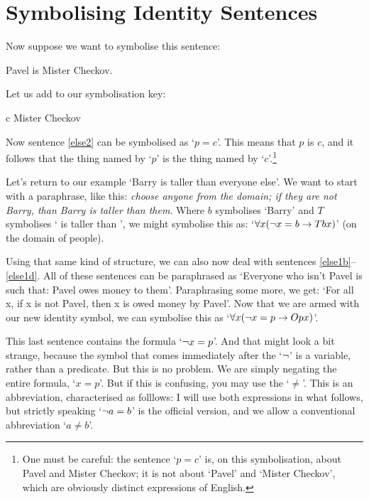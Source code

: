 \section{Symbolising Identity Sentences}

Now suppose we want to symbolise this sentence:
\begin{earg}
\item[\ex{else2}] Pavel is Mister Checkov.
\end{earg}
Let us add to our symbolisation key:
	\begin{ekey}
		\item[c] Mister Checkov
	\end{ekey}
Now sentence \ref{else2} can be symbolised as `$p=c$'. This means that $p$ is $c$, and it follows that the thing named by `$p$' is the thing named by `$c$'.\footnote{One must be careful: the sentence `$p=c$' is, on this symbolisation, about Pavel and Mister Checkov; it is not about `Pavel' and `Mister Checkov', which are obviously distinct expressions of English.}

Let's return to our example `Barry is taller than everyone else'. We want to start with a paraphrase, like this: \emph{choose anyone from the domain; if they are not Barry, than Barry is taller than them}. Where $b$ symbolises `Barry' and $T$ symbolises ` is taller than ', we might symbolise this as: `$\forall x (\neg x = b \rightarrow Tbx)$' (on the domain of people). 

Using that same kind of structure, we can also now deal with sentences \ref{else1b}–\ref{else1d}. All of these sentences can be  paraphrased as `Everyone who isn't Pavel is such that: Pavel owes money to them'. Paraphrasing some more, we get: `For all x, if x is not Pavel, then x is owed money by Pavel'. Now that we are armed with our new identity symbol, we can symbolise this as `$\forall x (\neg x = p \rightarrow Opx)$'.

This last sentence contains the formula `$\neg x = p$'. And that might look a bit strange, because the symbol that comes immediately after the `$\neg$' is a variable, rather than a predicate. But this is no problem. We are simply negating the entire formula, `$x = p$'. But if this is confusing, you may use  the  `$≠$'. This is an abbreviation, characterised as folllows:  I will use both expressions in what follows, but strictly speaking `$\neg a = b$' is the official version, and we allow a conventional abbreviation `$a≠b$'.

